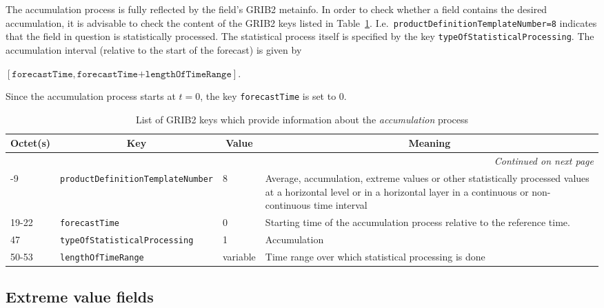The accumulation process is fully reflected by the field's GRIB2 metainfo. In order to check whether a field contains the desired accumulation, 
it is advisable to check the content of the GRIB2 keys listed in Table~\ref{tab_GRIB2acc}.
I.e.\ \texttt{productDefinitionTemplateNumber=8} indicates that the field in question is statistically processed. The statistical process itself 
is specified by the key \texttt{typeOfStatisticalProcessing}. The accumulation interval (relative to the start of the forecast) is given by 
\begin{center}
$[\texttt{forecastTime},\texttt{forecastTime+lengthOfTimeRange}]$. 
\end{center}
Since the accumulation process starts at $t=0$, the key \texttt{forecastTime} 
is set to 0. 
\begin{longtable}{p{1.2cm}p{5.5cm}p{1.0cm}p{6.0cm}}
\caption[]{List of GRIB2 keys which provide information about the \emph{accumulation} process}\label{tab_GRIB2acc}\\
  \toprule
\multicolumn{1}{c}{\textbf{Octet(s)}}  &  \multicolumn{1}{c}{\textbf{Key}}  & \multicolumn{1}{c}{\textbf{Value}} & \multicolumn{1}{c}{\textbf{Meaning}} \\
\midrule
\endhead
\hline \multicolumn{4}{r}{\textit{Continued on next page}} \\
\endfoot
\endlastfoot
 8-9        &  \texttt{productDefinitionTemplateNumber}             &     8               &    Average, accumulation, extreme values or other statistically processed values at a horizontal level or in a horizontal layer in a continuous or non-continuous time interval   \\
 19-22      &  \texttt{forecastTime}                                &     0               &    Starting time of the accumulation process relative to the reference time. \\
 47         &  \texttt{typeOfStatisticalProcessing}                 &     1               &    Accumulation                                  \\
 50-53      &  \texttt{lengthOfTimeRange}                           &    variable         &    Time range over which statistical processing is done \\
\bottomrule
\end{longtable}



\subsection{Extreme value fields}

